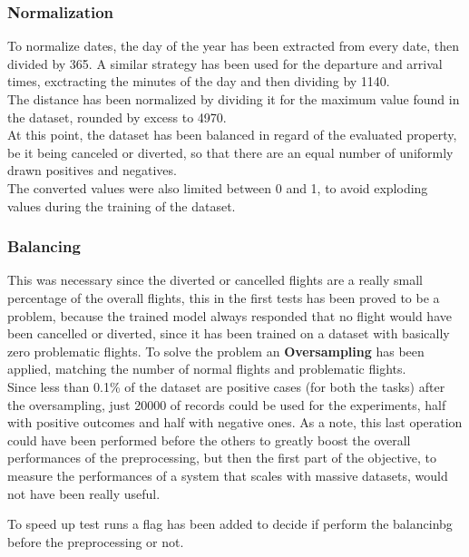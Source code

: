 \documentclass[
	letterpaper, %
	10pt, %
]{class}
\begin{document}
\subsubsection{Normalization}

To normalize dates, the day of the year has been extracted from every date, then divided by 365. A similar strategy has been used for the departure and arrival times, exctracting the minutes of the day and then dividing by 1140.\\

The distance has been normalized by dividing it for the maximum value found in the dataset, rounded by excess to 4970.\\

At this point, the dataset has been balanced in regard of the evaluated property, be it being canceled or diverted, so that there are an equal number of uniformly drawn positives and negatives.\\

The converted values were also limited between 0 and 1, to avoid exploding values during the training of the dataset.\\

\subsubsection{Balancing}

This was necessary since the diverted or cancelled flights are a really small percentage of the overall flights,
this in the first tests has been proved to be a problem, because the trained model always responded that no flight would have been cancelled or diverted, since it has been trained on a dataset with basically zero problematic flights.
To solve the problem an \textbf{Oversampling} has been applied, matching the number of normal flights and problematic flights.\\

Since less than 0.1\% of the dataset are positive cases (for both the tasks) after the oversampling, just 20000 of records could be used for the experiments, half with positive outcomes and half with negative ones.
As a note, this last operation could have been performed before the others to greatly boost the overall performances of the preprocessing, but then the first part of the objective, to measure the performances of a system that scales with massive datasets, would not have been really useful. \label{note_on_preprocessing}

To speed up test runs a flag has been added to decide if perform the balancinbg before the preprocessing or not.
\end{document}
